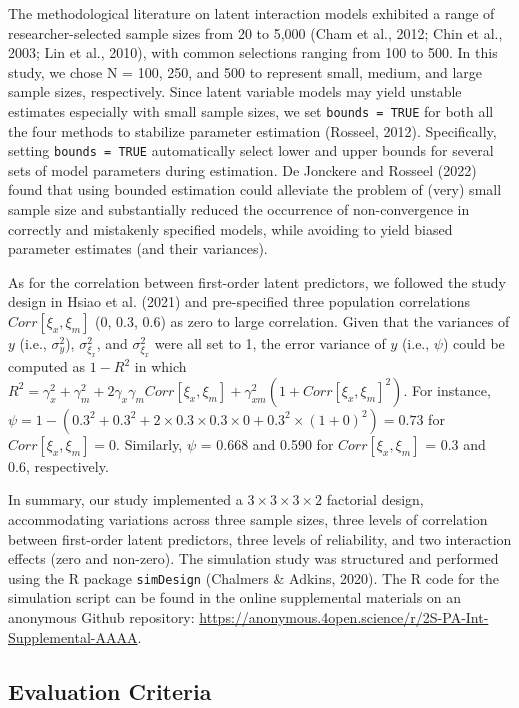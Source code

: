 \documentclass[
  man,mask]{apa6}
\begin{document}
The methodological literature on latent interaction models exhibited a range of researcher-selected sample sizes from 20 to 5,000 (Cham et al., 2012; Chin et al., 2003; Lin et al., 2010), with common selections ranging from 100 to 500. In this study, we chose N = 100, 250, and 500 to represent small, medium, and large sample sizes, respectively. Since latent variable models may yield unstable estimates especially with small sample sizes, we set \texttt{bounds\ =\ TRUE} for both all the four methods to stabilize parameter estimation (Rosseel, 2012). Specifically, setting \texttt{bounds\ =\ TRUE} automatically select lower and upper bounds for several sets of model parameters during estimation. De Jonckere and Rosseel (2022) found that using bounded estimation could alleviate the problem of (very) small sample size and substantially reduced the occurrence of non-convergence in correctly and mistakenly specified models, while avoiding to yield biased parameter estimates (and their variances).

As for the correlation between first-order latent predictors, we followed the study design in Hsiao et al. (2021) and pre-specified three population correlations \(Corr[{\xi_{x},\xi_{m}}]\) (0, 0.3, 0.6) as zero to large correlation. Given that the variances of \(y\) (i.e., \(\sigma_{y}^2\)), \(\sigma_{\xi_{x}}^2\), and \(\sigma_{\xi_{x}}^2\) were all set to 1, the error variance of \(y\) (i.e., \(\psi\)) could be computed as \(1 - R^2\) in which \(R^2 = \gamma_{x}^2 + \gamma_{m}^2 + 2\gamma_{x}\gamma_{m}Corr[{\xi_{x},\xi_{m}}] + \gamma_{xm}^2(1 + Corr[{\xi_{x},\xi_{m}}]^2)\). For instance, \(\psi = 1 - (0.3^2 + 0.3^2 + 2\times0.3\times0.3\times0 + 0.3^2\times(1 + 0)^2) = 0.73\) for \(Corr[{\xi_{x},\xi_{m}}] = 0\). Similarly, \(\psi\) = 0.668 and 0.590 for \(Corr[{\xi_{x},\xi_{m}}]\) = 0.3 and 0.6, respectively.

In summary, our study implemented a \(3 \times 3 \times 3 \times 2\) factorial design, accommodating variations across three sample sizes, three levels of correlation between first-order latent predictors, three levels of reliability, and two interaction effects (zero and non-zero). The simulation study was structured and performed using the R package \texttt{simDesign} (Chalmers \& Adkins, 2020). The R code for the simulation script can be found in the online supplemental materials on an anonymous Github repository: \url{https://anonymous.4open.science/r/2S-PA-Int-Supplemental-AAAA}.

\subsection{Evaluation Criteria}\label{evaluation-criteria}
\end{document}
